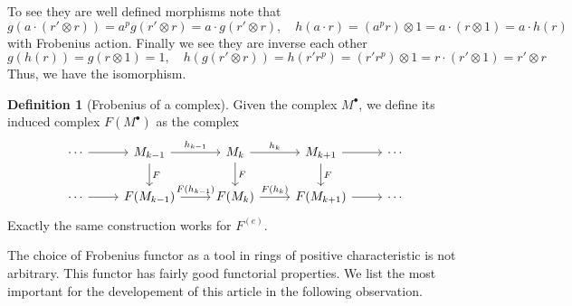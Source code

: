 \documentclass[leqno]{article}
\theoremstyle{definition}
\newtheorem{definition}{Definition}[section]
\begin{document}
To see they are well defined morphisms note that 
\[
g(a \cdot (r'\otimes r)) = a^p g(r'\otimes r) = a\cdot g(r'\otimes r), \quad h(a\cdot r)= (a^pr)\otimes 1 = a\cdot (r \otimes 1) = a \cdot h(r)
\]
with Frobenius action. Finally we see they are inverse each other
\[
g(h(r)) = g(r\otimes 1) = 1, \quad h(g(r'\otimes r)) = h(r'r^p) = (r'r^p)\otimes 1 = r\cdot (r'\otimes 1) = r'\otimes r
\] 
Thus, we have the isomorphism.


\begin{definition}[Frobenius of a complex] Given the complex $M^{\bullet}$, we define its induced complex $F(M^{\bullet})$ as the complex
\[\begin{tikzcd}
	\cdots & {M_{k-1}} & {M_{k}} & {M_{k+1}} & \cdots \\
	\cdots & {F(M_{k-1})} & {F(M_{k})} & {F(M_{k+1})} & \cdots
	\arrow["F", from=1-2, to=2-2]
	\arrow["F", from=1-3, to=2-3]
	\arrow["F", from=1-4, to=2-4]
	\arrow["{h_{k-1}}", from=1-2, to=1-3]
	\arrow["{h_k}", from=1-3, to=1-4]
	\arrow["{F(h_{k-1})}", from=2-2, to=2-3]
	\arrow["{F(h_k)}", from=2-3, to=2-4]
	\arrow[from=1-1, to=1-2]
	\arrow[from=1-4, to=1-5]
	\arrow[from=2-4, to=2-5]
	\arrow[from=2-1, to=2-2]
\end{tikzcd}\]
Exactly the same construction works for $F ^{(e)}$.
\end{definition}

The choice of Frobenius functor as a tool in rings of positive characteristic is not arbitrary. This functor has fairly good functorial properties. We list the most important for the developement of this article in the following observation.
\end{document}
